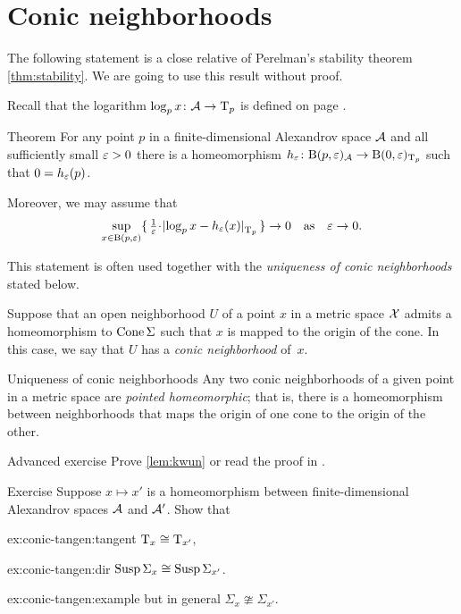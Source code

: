 \section{Conic neighborhoods}

The following statement \cite{perelman1993} is a close relative of Perelman's stability theorem \ref{thm:stability}.
We are going to use this result without proof.

Recall that the logarithm $\log_px\colon\mathcal{A}\to \mathrm{T}_p$ is defined on page \pageref{page:log}.

\begin{thm}{Theorem}\label{thm:spherical-nbhd}
For any point $p$ in a finite-dimensional Alexandrov space $\mathcal{A}$
and all sufficiently small $\varepsilon>0$
there is a homeomorphism $h_\varepsilon\colon\mathrm{B}{}(p,\varepsilon)_{\mathcal{A}}\to \mathrm{B}{}(0,\varepsilon)_{\mathrm{T}_p}$ such that $0=h_\varepsilon(p)$.

Moreover, we may assume that 
\[
\sup_{x\in \oBall(p,\eps)}\{\,\tfrac1\eps\cdot\dist{\log_px}{h_\eps(x)}{\T_p}\,\}\to 0
\quad\text{as}\quad
\eps\to 0.\]
\end{thm}

This statement is often used together with the \textit{uniqueness of conic neighborhoods} stated below.

Suppose that an open  neighborhood $U$ of a point $x$ in a metric space $\mathcal{X}$
admits a homeomorphism to $\mathop{\rm Cone}\nolimits\Sigma$ such that $x$ is mapped to the origin of the cone.
In this case, we say that $U$ has a \emph{conic neighborhood} of~$x$.

\begin{thm}{Uniqueness of conic neighborhoods}\label{lem:kwun}
Any two conic neighborhoods of a given point in a metric space are \emph{pointed homeomorphic}; that is, there is a homeomorphism between neighborhoods that maps the origin of one cone to the origin of the other.
\end{thm}

\begin{thm}{Advanced exercise}\label{ex:conic}
Prove \ref{lem:kwun} or read the proof in \cite{kwun1964}.
\end{thm}


\begin{thm}{Exercise}\label{ex:conic-tangent}
Suppose $x\mapsto x'$ is a homeomorphism between finite-dimensional Alexandrov spaces $\mathcal{A}$ and $\mathcal{A}'$. Show that 

\begin{subthm}{ex:conic-tangen:tangent}
$\mathrm{T}_x\cong \mathrm{T}_{x'}$,
\end{subthm}

\begin{subthm}{ex:conic-tangen:dir}
$\mathop{\rm Susp}\nolimits\Sigma_x\cong \mathop{\rm Susp}\nolimits\Sigma_{x'}$.
\end{subthm}

\begin{subthm}{ex:conic-tangen:example}
but in general $\Sigma_x\ncong\Sigma_{x'}$.
\end{subthm}

\end{thm}



